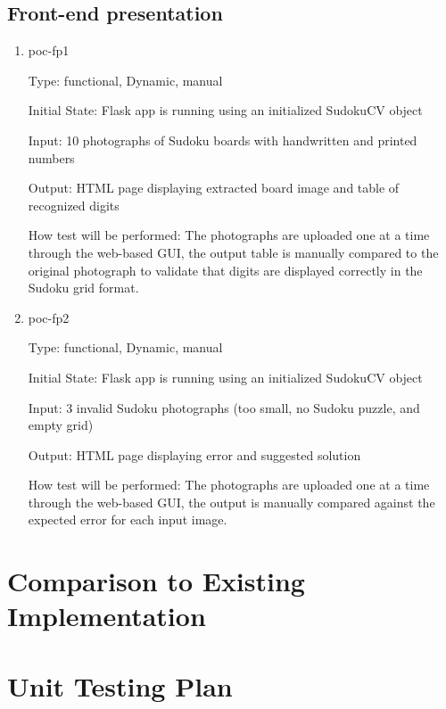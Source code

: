 \documentclass[11pt]{article}
\begin{document}
\subsection{Front-end presentation}
\begin{enumerate}

\item{poc-fp1\\}

Type: functional, Dynamic, manual
					
Initial State: Flask app is running using an initialized SudokuCV object
					
Input: 10 photographs of Sudoku boards with handwritten and printed numbers
					
Output: HTML page displaying extracted board image and table of recognized digits 
					
How test will be performed: The photographs are uploaded one at a time through the web-based GUI, the output table is manually compared to the original photograph to validate that digits are displayed correctly in the Sudoku grid format.

\item{poc-fp2\\}

Type: functional, Dynamic, manual
					
Initial State: Flask app is running using an initialized SudokuCV object
					
Input: 3 invalid Sudoku photographs (too small, no Sudoku puzzle, and empty grid)
					
Output: HTML page displaying error and suggested solution
					
How test will be performed: The photographs are uploaded one at a time through the web-based GUI, the output is manually compared against the expected error for each input image.

\end{enumerate}

	
\section{Comparison to Existing Implementation}	
				
\section{Unit Testing Plan}
		
\end{document}
